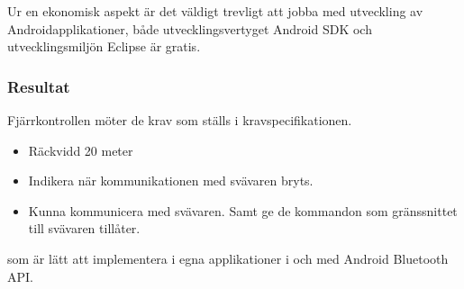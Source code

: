 Ur en ekonomisk aspekt är det väldigt trevligt att jobba med utveckling av
Androidapplikationer, både utvecklingsvertyget Android SDK och utvecklingsmiljön Eclipse är gratis.

\subsubsection{Resultat}
Fjärrkontrollen möter de krav som ställs i kravspecifikationen.


\begin {itemize}
\item Räckvidd 20 meter
\item Indikera när kommunikationen med svävaren bryts.
\item Kunna kommunicera med svävaren. Samt ge de kommandon som gränssnittet till svävaren tillåter.
\end {itemize}

som är lätt att implementera i egna applikationer i och med
Android Bluetooth API.